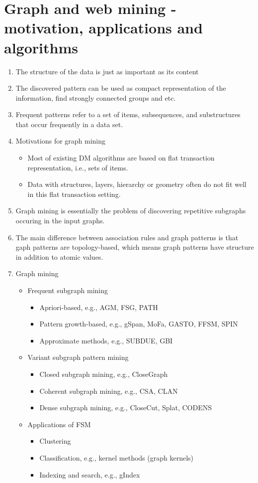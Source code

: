 \documentclass[14pt]{article}
\begin{document}
\section{Graph and web mining - motivation, applications and algorithms}
\begin{enumerate}
 \item The structure of the data is just as important as its content
 \item The discovered pattern can be used as compact representation of the information, find strongly connected groups and etc.
 \item Frequent patterns refer to a set of items, subsequences, and substructures that occur frequently in a data set. 
 \item Motivations for graph mining
  \begin{itemize}
   \item Most of existing DM algorithms are based on flat transaction representation, i.e., sets of items. 
   \item Data with structures, layers, hierarchy or geometry often do not fit well in this flat transaction setting.
  \end{itemize}
 \item Graph mining is essentially the problem of discovering repetitive subgraphs occuring in the input graphs.
 \item The main difference between association rules and graph patterns is that gaph patterns are topology-based, which means graph patterns have structure in addition to atomic values.
 \item Graph mining
  \begin{itemize}
   \item Frequent subgraph mining
    \begin{itemize}
     \item Apriori-based, e.g., AGM, FSG, PATH
     \item Pattern growth-based, e.g., gSpan, MoFa, GASTO, FFSM, SPIN
     \item Approximate methods, e.g., SUBDUE, GBI
    \end{itemize}
   \item Variant subgraph pattern mining
    \begin{itemize}
     \item Closed subgraph mining, e.g., CloseGraph
     \item Coherent subgraph mining, e.g., CSA, CLAN
     \item Dense subgraph mining, e.g., CloseCut, Splat, CODENS
    \end{itemize}
   \item Applications of FSM
    \begin{itemize}
     \item Clustering
     \item Classification, e.g., kernel methods (graph kernels)
     \item Indexing and search, e.g., gIndex
    \end{itemize}
  \end{itemize}
\end{enumerate}
\end{document}
